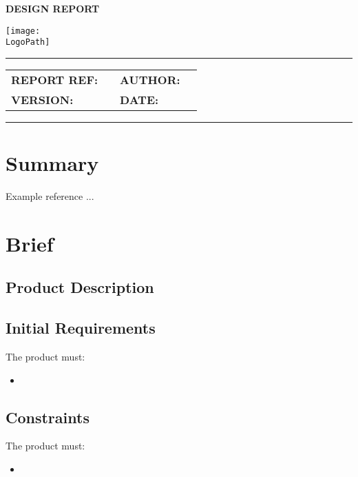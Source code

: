 \documentclass[10pt]{article}
\makeatletter
\newcommand{\customtitle}{%
  \noindent
  \begin{minipage}[t]{0.65\textwidth}
    \vspace{-0.5cm}
    {\ocrfamily\Large\bfseries DESIGN REPORT \par}
  \end{minipage}%
  \begin{minipage}[t]{0.35\textwidth}
    \flushright{}
    \texttt{[image: \\LogoPath]}
  \end{minipage}

  \vspace{0.3cm}
  \hrule height 0.8pt
  \vspace{0.3cm}

  {\ocrfamily\bfseries\ProjectFullRef\par}
  {\ocrfamily\large\bfseries\ReportTitle\par}

  \vspace{0.5em}

  \begin{tabular}{@{}ll@{\hspace{2cm}}ll@{}}
    \ocrfamily\textbf{REPORT REF:} & \ocrfamily \ReportRef &
    \ocrfamily\textbf{AUTHOR:}     & \ocrfamily \AuthorName \\

    \ocrfamily\textbf{VERSION:}    & \ocrfamily \DocVersion &
    \ocrfamily\textbf{DATE:}       & \ocrfamily \ReleaseDate \\
  \end{tabular}

  \vspace{0.3cm}
  \hrule height 0.8pt
  \vspace{0.25cm}
}
\makeatother
\begin{document}
\vspace*{-1cm}
\thispagestyle{plain}
\customtitle{}


\section{Summary}

Example reference \cite{hibbeler2016mechanics}...

\section{Brief}

\subsection{Product Description}

\subsection{Initial Requirements}
The product must:
\begin{itemize}[leftmargin=*] %
	\item %
\end{itemize}

\subsection{Constraints}
The product must:
\begin{itemize}[leftmargin=*] %
	\item %
\end{itemize}
\end{document}
